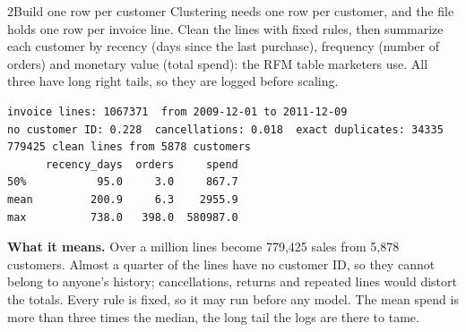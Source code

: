 
\begin{labquestion}{2}{Build one row per customer}
Clustering needs one row per customer, and the file holds one row per invoice line. Clean the lines with fixed rules, then summarize each customer by recency (days since the last purchase), frequency (number of orders) and monetary value (total spend): the RFM table marketers use. All three have long right tails, so they are logged before scaling.
\end{labquestion}
\begin{labanswer}


\begin{refoutput}
\begin{lstlisting}[style=utpterminal]
invoice lines: 1067371  from 2009-12-01 to 2011-12-09
no customer ID: 0.228  cancellations: 0.018  exact duplicates: 34335
779425 clean lines from 5878 customers
      recency_days  orders     spend
50%           95.0     3.0     867.7
mean         200.9     6.3    2955.9
max          738.0   398.0  580987.0
\end{lstlisting}
\end{refoutput}

\textbf{What it means.} Over a million lines become 779,425 sales from 5,878 customers. Almost a quarter of the lines have no customer ID, so they cannot belong to anyone's history; cancellations, returns and repeated lines would distort the totals. Every rule is fixed, so it may run before any model. The mean spend is more than three times the median, the long tail the logs are there to tame.
\end{labanswer}

